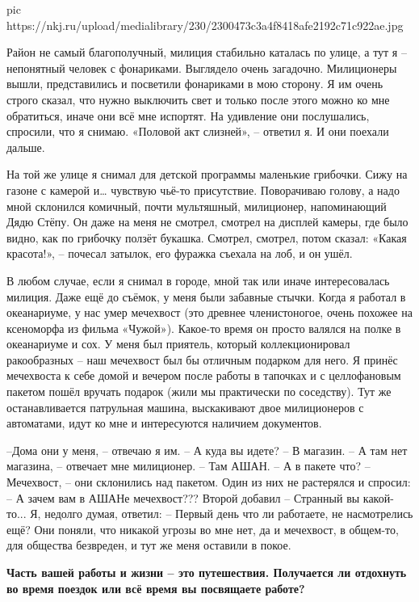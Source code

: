 \ifcmt
pic https://nkj.ru/upload/medialibrary/230/2300473c3a4f8418afe2192c71c922ae.jpg
\fi

Район не самый благополучный, милиция стабильно каталась по улице, а тут я –
непонятный человек с фонариками. Выглядело очень загадочно. Милиционеры вышли,
представились и посветили фонариками в мою сторону. Я им очень строго сказал,
что нужно выключить свет и только после этого можно ко мне обратиться, иначе
они всё мне испортят. На удивление они послушались, спросили, что я снимаю.
«Половой акт слизней», – ответил я. И они поехали дальше.

На той же улице я снимал для детской программы маленькие грибочки. Сижу на
газоне с камерой и… чувствую чьё-то присутствие. Поворачиваю голову, а надо
мной склонился комичный, почти мультяшный, милиционер, напоминающий Дядю Стёпу.
Он даже на меня не смотрел, смотрел на дисплей камеры, где было видно, как по
грибочку ползёт букашка. Смотрел, смотрел, потом сказал: «Какая красота!», –
почесал затылок, его фуражка съехала на лоб, и он ушёл.

В любом случае, если я снимал в городе, мной так или иначе интересовалась
милиция. Даже ещё до съёмок, у меня были забавные стычки. Когда я работал в
океанариуме, у нас умер мечехвост (это древнее членистоногое, очень похожее на
ксеноморфа из фильма «Чужой»). Какое-то время он просто валялся на полке в
океанариуме и сох. У меня был приятель, который коллекционировал ракообразных –
наш мечехвост был бы отличным подарком для него. Я принёс мечехвоста к себе
домой и вечером после работы в тапочках и с целлофановым пакетом пошёл вручать
подарок (жили мы практически по соседству). Тут же останавливается патрульная
машина, выскакивают двое милиционеров с автоматами, идут ко мне и интересуются
наличием документов. 

\obeycr
–Дома они у меня, – отвечаю я им.
– А куда вы идете?
– В магазин.
– А там нет магазина, – отвечает мне милиционер.
– Там АШАН.
– А в пакете что?
– Мечехвост, – они склонились над пакетом. Один из них не растерялся и спросил:
– А зачем вам в АШАНе мечехвост???
Второй добавил
– Странный вы какой-то...
Я, недолго думая, ответил:
– Первый день что ли работаете, не насмотрелись ещё?
Они поняли, что никакой угрозы во мне нет, да и мечехвост, в общем-то, для общества безвреден, и тут же меня оставили в покое. 
\restorecr

{\bfseries 
Часть вашей работы и жизни – это путешествия. Получается ли отдохнуть во время поездок или всё время вы посвящаете работе?
}

